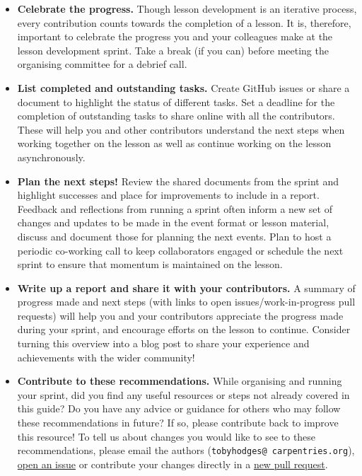 \documentclass[
]{book}
\begin{document}
\begin{itemize}
\item
  \textbf{Celebrate the progress.}
  Though lesson development is an iterative process, every contribution counts towards the completion of a lesson.
  It is, therefore, important to celebrate the progress you and your colleagues make at the lesson development sprint.
  Take a break (if you can) before meeting the organising committee for a debrief call.
\item
  \textbf{List completed and outstanding tasks.}
  Create GitHub issues or share a document to highlight the status of different tasks.
  Set a deadline for the completion of outstanding tasks to share online with all the contributors.
  These will help you and other contributors understand the next steps when working together on the lesson as well as continue working on the lesson asynchronously.
\item
  \textbf{Plan the next steps!}
  Review the shared documents from the sprint and highlight successes and place for improvements to include in a report.
  Feedback and reflections from running a sprint often inform a new set of changes and updates to be made in the event format or lesson material, discuss and document those for planning the next events.
  Plan to host a periodic co-working call to keep collaborators engaged or schedule the next sprint to
  ensure that momentum is maintained on the lesson.
\item
  \textbf{Write up a report and share it with your contributors.}
  A summary of progress made and next steps (with links to open issues/work-in-progress pull requests)
  will help you and your contributors appreciate the progress made during your sprint,
  and encourage efforts on the lesson to continue.
  Consider turning this overview into a blog post to share your experience and achievements with the wider community!
\item
  \textbf{Contribute to these recommendations.}
  While organising and running your sprint, did you find any useful resources or steps not already covered
  in this guide?
  Do you have any advice or guidance for others who may follow these recommendations in future?
  If so, please contribute back to improve this resource!
  To tell us about changes you would like to see to these recommendations,
  please email the authors (\texttt{tobyhodges@\ carpentries.org}),
  \href{https://github.com/carpentries/docs.carpentries.org/issues/new}{open an issue}
  or contribute your changes directly in a \href{https://github.com/carpentries/docs.carpentries.org/pulls}{new pull request}.
\end{itemize}
\end{document}

